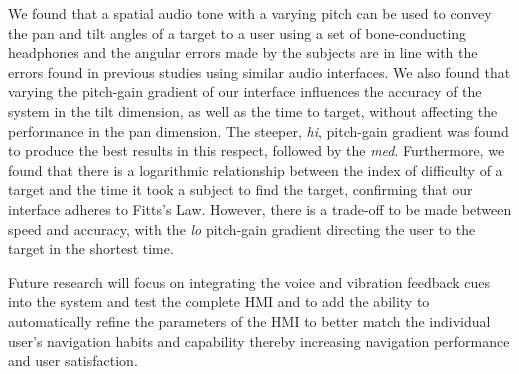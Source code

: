 \documentclass[format=sigconf, review=true, screen=true, anonymous=true]{acmart}
\begin{document}
We found that a spatial audio tone with a varying pitch can be used to convey the pan and tilt angles of a target to a user using a set of bone-conducting headphones and the angular errors made by the subjects are in line with the errors found in previous studies using similar audio interfaces. We also found that varying the pitch-gain gradient of our interface influences the accuracy of the system in the tilt dimension, as well as the time to target, without affecting the performance in the pan dimension. The steeper, \emph{hi}, pitch-gain gradient was found to produce the best results in this respect, followed by the \emph{med}. Furthermore, we found that there is a logarithmic relationship between the index of difficulty of a target and the time it took a subject to find the target, confirming that our interface adheres to Fitts's Law. However, there is a trade-off to be made between speed and accuracy, with the \emph{lo} pitch-gain gradient directing the user to the target in the shortest time. 

Future research will focus on integrating the voice and vibration feedback cues into the system and test the complete HMI and to add the ability to automatically refine the parameters of the HMI to better match the individual user's navigation habits and capability thereby increasing navigation performance and user satisfaction.





\end{document}
